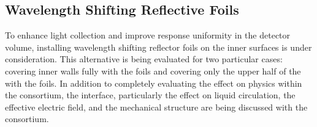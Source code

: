 \subsection{Wavelength Shifting Reflective Foils}
\label{sec:dp-pds-appendix-wlsfoils}

To enhance light collection and improve response uniformity in the detector volume, installing wavelength shifting reflector foils on the  inner surfaces is under consideration. This alternative is being evaluated for two particular cases: covering  inner walls fully with the foils and covering only the upper half of the  with the foils. In addition to completely evaluating the effect on physics within the consortium, the interface, particularly the effect on liquid circulation, the effective electric field, and the mechanical structure are being discussed with the  consortium.

